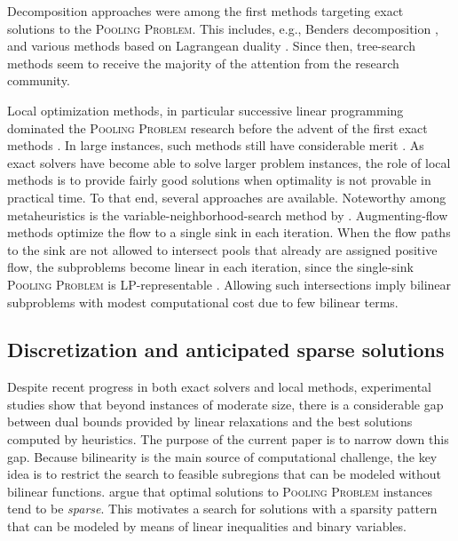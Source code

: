 \documentclass[pdflatex,sn-mathphys-num]{sn-jnl}%
\theoremstyle{thmstyleone}%
\begin{document}
Decomposition approaches were among the first methods targeting exact solutions to the \textsc{Pooling Problem}.
This includes, e.g., Benders decomposition \cite{floudas90a,visweswaran90}, and various methods based on Lagrangean duality
\cite{adhya99,floudas90b}.
Since then, tree-search methods seem to receive the majority of the attention from the research community.

Local optimization methods, in particular successive linear programming \cite{haverly78,baker85}  dominated
the \textsc{Pooling Problem} research before the advent of the first exact methods \cite{floudas90a,floudas90b}.
In large instances, such methods still have considerable merit \cite{grothey23}.
As exact solvers have become able to solve larger problem instances,
the role of local methods is to provide fairly good solutions when optimality is not provable in practical time.
To that end, several approaches are available.
Noteworthy among metaheuristics is the variable-neighborhood-search method by \citet{audet04}.
Augmenting-flow methods \cite{alfaki14,xiang26} optimize the flow to a single sink in each iteration.
When the flow paths to the sink are not allowed to intersect pools that already are assigned positive flow,
the subproblems become linear in each iteration, since the single-sink \textsc{Pooling Problem} is LP-representable \cite{haugland16a}.
Allowing such intersections imply bilinear subproblems with modest computational cost due to few bilinear terms.

\subsection{Discretization and anticipated sparse solutions} \label{sec:sparse}

Despite recent progress in both exact solvers and local methods, experimental studies show that beyond instances of moderate size,
there is a considerable gap between dual bounds provided by linear relaxations and the best solutions computed by heuristics.
The purpose of the current paper is to narrow down this gap.
Because bilinearity is the main source of computational challenge, the key idea is to restrict the search to feasible subregions
that can be modeled without bilinear functions.
\citet{baltean18} argue that optimal solutions to \textsc{Pooling Problem} instances tend to be \emph{sparse}.
This motivates a search for solutions with a sparsity pattern that can be modeled by means of linear inequalities and binary variables.
\end{document}
